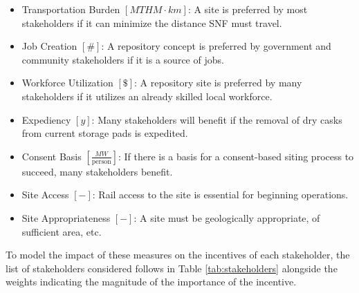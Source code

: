 \begin{itemize}
        \item Transportation Burden $[MTHM \cdot km]$: A site is preferred by 
                most stakeholders if it can minimize the distance \gls{SNF} 
                must travel.
        \item Job Creation $[\#]$: A repository concept is preferred by 
                government and community stakeholders if it is a source of 
                jobs. 
        \item Workforce Utilization $[\$]$: A repository site is preferred by 
                many stakeholders if it utilizes an already skilled local 
                workforce. 
        \item Expediency $[y]$: Many stakeholders will benefit if the removal 
                of dry casks from current storage pads is expedited.
        \item Consent Basis $[\frac{MW}{\mbox{person}}]$: If there is a basis for a consent-based 
                siting process to succeed, many stakeholders benefit.
        \item Site Access $[-]$: Rail access to the site is essential for 
                beginning operations.
        \item Site Appropriateness $[-]$: A site must be geologically 
                appropriate, of sufficient area, etc.
\end{itemize}

To model the impact of these measures on the incentives of each stakeholder, 
the list of stakeholders considered follows in Table \ref{tab:stakeholders} 
alongside the weights indicating the magnitude of the importance of the incentive.
 
\begin{table}[h]

\centering
\caption {Metrics and Weight for Each Stakeholder}
\end{table}

